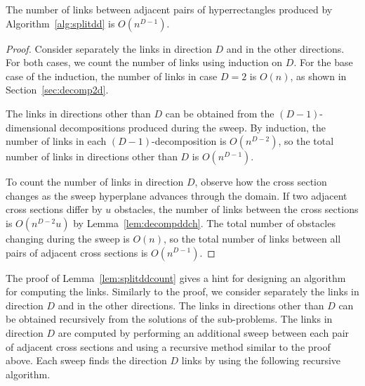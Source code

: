 \documentclass[english,gradu]{tktltiki2018}
\begin{document}
\begin{lem}\label{lem:splitddcount}The number of links between adjacent pairs of hyperrectangles produced by Algorithm~\ref{alg:splitdd} is $O(n^{D-1})$.\end{lem}
\begin{proof}
Consider separately the links in direction $D$ and in the other directions.
For both cases, we count the number of links using induction on $D$.
For the base case of the induction, the number of links in case $D=2$ is $O(n)$, as shown in Section~\ref{sec:decomp2d}.

The links in directions other than $D$ can be obtained from the $(D-1)$-dimensional decompositions produced during the sweep.
By induction, the number of links in each $(D-1)$-decomposition is $O(n^{D-2})$, so the total number of links in directions other than $D$ is $O(n^{D-1})$.

To count the number of links in direction $D$, observe how the cross section changes as the sweep hyperplane advances through the domain.
If two adjacent cross sections differ by $u$ obstacles, the number of links between the cross sections is $O(n^{D-2}u)$ by Lemma~\ref{lem:decompddch}.
The total number of obstacles changing during the sweep is $O(n)$, so the total number of links between all pairs of adjacent cross sections is $O(n^{D-1})$.
\end{proof}

The proof of Lemma~\ref{lem:splitddcount} gives a hint for designing an algorithm for computing the links.
Similarly to the proof, we consider separately the links in direction $D$ and in the other directions.
The links in directions other than $D$ can be obtained recursively from the solutions of the sub-problems.
The links in direction $D$ are computed by performing an additional sweep between each pair of adjacent cross sections and using a recursive method similar to the proof above.
Each sweep finds the direction $D$ links by using the following recursive algorithm.
\end{document}
